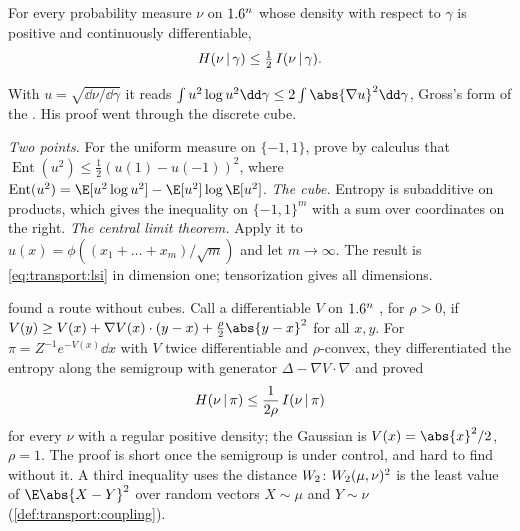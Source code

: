 \begin{refsection}
\begin{theorem}\label{thm:transport:gross}
For every probability measure $\nu$ on $1.6^n$ whose density with respect to $\gamma$ is positive and continuously differentiable,
\begin{equation}\label{eq:transport:lsi}
H(\nu\,|\,\gamma)\le\tfrac12\,I(\nu\,|\,\gamma).
\end{equation}
\end{theorem}

With $u=\sqrt{\dd\nu/\dd\gamma}$ it reads $\int u^2\log u^2\dd\gamma\le2\int\abs{\nabla u}^2\dd\gamma$, Gross's form of the . His proof went through the discrete cube.

\begin{aside}
\emph{Two points.} For the uniform measure on $\{-1,1\}$, prove by calculus that $\operatorname{Ent}(u^2)\le\frac12(u(1)-u(-1))^2$, where $\operatorname{Ent}(u^2)=\E[u^2\log u^2]-\E[u^2]\log\E[u^2]$.
\emph{The cube.} Entropy is subadditive on products, which gives the inequality on $\{-1,1\}^m$ with a sum over coordinates on the right.
\emph{The central limit theorem.} Apply it to $u(x)=\phi((x_1+\dots+x_m)/\sqrt m)$ and let $m\to\infty$. The result is \eqref{eq:transport:lsi} in dimension one; tensorization gives all dimensions.
\end{aside}

\textcite{BakryEmery1985} found a route without cubes. Call a differentiable $V$ on $1.6^n$ , for $\rho>0$, if $V(y)\ge V(x)+\nabla V(x)\cdot(y-x)+\frac{\rho}{2}\abs{y-x}^2$ for all $x,y$. For $\pi=Z^{-1}e^{-V(x)}\dd x$ with $V$ twice differentiable and $\rho$-convex, they differentiated the entropy along the semigroup with generator $\Delta-\nabla V\cdot\nabla$ and proved
\begin{equation}\label{eq:transport:be}
H(\nu\,|\,\pi)\le\frac{1}{2\rho}\,I(\nu\,|\,\pi)
\end{equation}
for every $\nu$ with a regular positive density; the Gaussian is $V(x)=\abs{x}^2/2$, $\rho=1$. The proof is short once the semigroup is under control, and hard to find without it. A third inequality uses the distance $W_2$: $W_2(\mu,\nu)^2$ is the least value of $\E\abs{X-Y}^2$ over random vectors $X\sim\mu$ and $Y\sim\nu$ (\cref{def:transport:coupling}).


\end{refsection}
